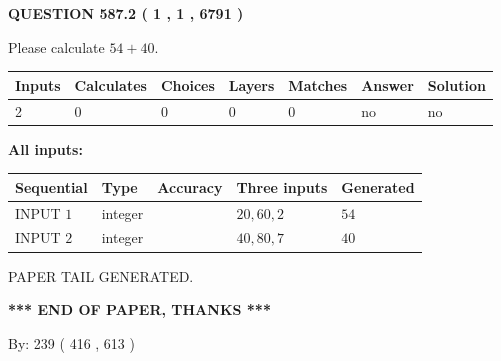 \documentclass[12pt]{article}
\begin{document}
   
  
\vspace{0.2in}
  
{\textbf{\Large{QUESTION
587.2 
 ( 1 , 1 , 6791 )
}}}
  
  
 
Please calculate $ %
54 +  %
40 $.
 
 
   
   
   
   
\noindent\begin{tabular}{|l|l|l|l|l|l|l|}
 \hline
Inputs & Calculates & Choices & Layers & Matches & Answer & Solution \\ \hline
 2  & 
 0  & 
 0
  & 
 0  & 
 0  & 
  no & 
  no 
  \\ \hline
 \end{tabular}
   
   
   
   
\noindent{}
   
   
   
   
\noindent\vspace{0.1in}\hspace{-0.08in} {\textbf{\Large{All inputs: }}}
   
   
  
  
\noindent\begin{tabular}{|l|l|l|l|l|}
\hline
 Sequential & Type & Accuracy & Three inputs & Generated \\ 
\hline
 
 
  INPUT $  1 $ & integer &  & $
 20
 , 
 60
 , 
 2
 $ & $ 54 $ 
 \\  \hline  
 
 
  INPUT $  2 $ & integer &  & $
 40
 , 
 80
 , 
 7
 $ & $ 40 $ 
 \\  \hline  
 \end{tabular}
   
   
   
   
   
   
 \vspace{0.2in}
 
   
   
\vspace{2.0in} PAPER TAIL GENERATED.
   
   
   
   
\vspace{1.0in} 
{\textbf{\large{ *** END OF PAPER, THANKS *** }}} 
   
   
\hspace{1.0in} By: 
 239 ( 416 ,  613 )
   
\end{document}
